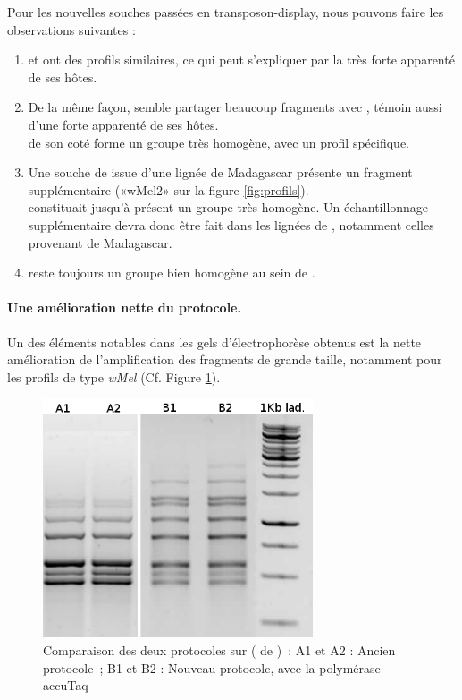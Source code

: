 Pour les nouvelles souches passées en transposon-display, nous pouvons faire les observations suivantes : 
\begin{enumerate}
	\item {} et  ont des profils similaires, ce qui peut s'expliquer par la très forte apparenté de ses hôtes.
	\item De la même façon,  semble partager beaucoup fragments avec , témoin aussi d'une forte apparenté de ses hôtes.\\
	 de son coté forme un groupe très homogène, avec un profil spécifique.
	\item Une souche de  issue d'une lignée de Madagascar présente un fragment supplémentaire («wMel2» sur la figure \ref{fig:profils}).\\
	 constituait jusqu'à présent un groupe très homogène.
	Un échantillonnage supplémentaire devra donc être fait dans les lignées de , notamment celles provenant de Madagascar.
	\item {} reste toujours un groupe bien homogène au sein de .
\end{enumerate}



\paragraph{Une amélioration nette du protocole.} %
\label{par:proto}
Un des éléments notables dans les gels d'électrophorèse obtenus est la nette amélioration de l'amplification des fragments de grande taille, notamment pour les profils de type \textit{wMel} (Cf. Figure \ref{fig:wMelcomp}). 

\begin{figure}[h]
	\begin{center}
		\includegraphics[width=80mm]{images/wMel_comp.png}
	\end{center}
	\caption{Comparaison des deux protocoles sur  ( de )~:
	A1 et A2 : Ancien protocole\cite{memHH}~;
	B1 et B2 : Nouveau protocole, avec la polymérase accuTaq}
	\label{fig:wMelcomp}
\end{figure}

